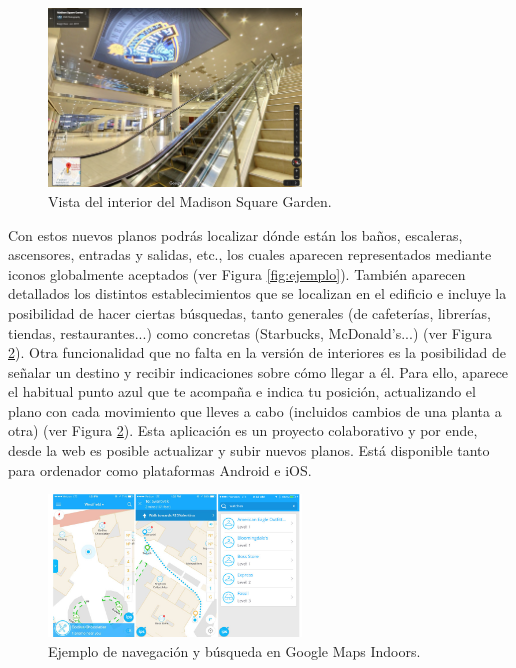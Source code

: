 \begin{figure}[t]
	\centering
	\includegraphics[width=0.6\textwidth]{Imagenes/Estadodelacuestion/MadSq3}
	\caption{Vista del interior del Madison Square Garden. }
	\label{fig:ejemplo2}
\end{figure}

Con estos nuevos planos podrás localizar dónde están los baños, escaleras, ascensores, entradas y salidas, etc., los cuales aparecen representados mediante iconos globalmente aceptados (ver Figura \ref{fig:ejemplo}). También aparecen detallados los distintos establecimientos que se localizan en el edificio e incluye la posibilidad de hacer ciertas búsquedas, tanto generales (de cafeterías, librerías, tiendas, restaurantes...) como concretas (Starbucks, McDonald's...) (ver Figura \ref{fig:ejemplo3}). Otra funcionalidad que no falta en la versión de interiores es la posibilidad de señalar un destino y recibir indicaciones sobre cómo llegar a él. Para ello, aparece el habitual punto azul que te acompaña e indica tu posición, actualizando el plano con cada movimiento que lleves a cabo (incluidos cambios de una planta a otra) (ver Figura \ref{fig:ejemplo3}). Esta aplicación es un proyecto colaborativo y por ende, desde la web es posible actualizar y subir nuevos planos. Está disponible tanto para ordenador como plataformas Android e iOS.

\begin{figure}[t]
	\centering
	\includegraphics[width=0.6\textwidth]{Imagenes/Estadodelacuestion/GMapsInd}
	\caption{Ejemplo de navegación y búsqueda en Google Maps Indoors. }
	\label{fig:ejemplo3}
\end{figure}


